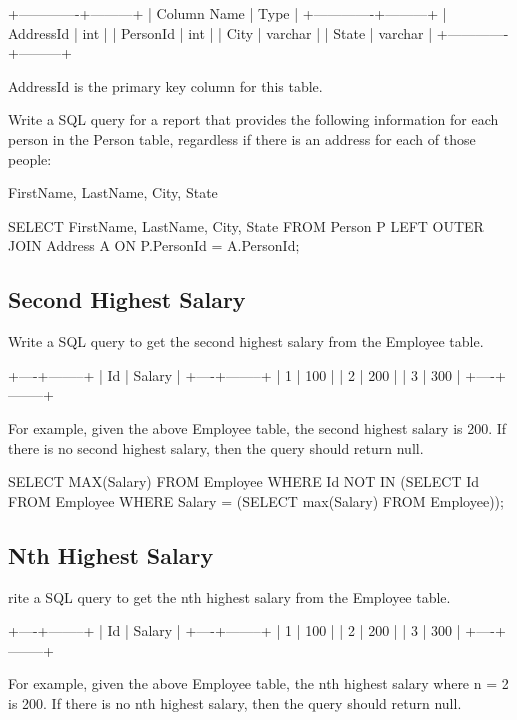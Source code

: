 \begin{Code}
	+-------------+---------+
	| Column Name | Type    |
	+-------------+---------+
	| AddressId   | int     |
	| PersonId    | int     |
	| City        | varchar |
	| State       | varchar |
	+-------------+---------+
\end{Code}

AddressId is the primary key column for this table.

Write a SQL query for a report that provides the following information for each person in the Person table, regardless if there is an address for each of those people:

FirstName, LastName, City, State

\begin{Code}
	SELECT FirstName, LastName, City, State 
	FROM Person P LEFT OUTER JOIN Address A
	ON P.PersonId = A.PersonId;
\end{Code}

\subsection{Second Highest Salary}
Write a SQL query to get the second highest salary from the Employee table.
\begin{Code}
	+----+--------+
	| Id | Salary |
	+----+--------+
	| 1  | 100    |
	| 2  | 200    |
	| 3  | 300    |
	+----+--------+
\end{Code}

For example, given the above Employee table, the second highest salary is 200. If there is no second highest salary, then the query should return null.

\begin{Code}
	SELECT MAX(Salary) FROM Employee 
	WHERE Id NOT IN (SELECT Id FROM Employee WHERE Salary = (SELECT max(Salary) FROM Employee));
\end{Code}

\subsection{Nth Highest Salary}
rite a SQL query to get the nth highest salary from the Employee table.
\begin{Code}
	+----+--------+
	| Id | Salary |
	+----+--------+
	| 1  | 100    |
	| 2  | 200    |
	| 3  | 300    |
	+----+--------+
\end{Code}

For example, given the above Employee table, the nth highest salary where n = 2 is 200. If there is no nth highest salary, then the query should return null.

